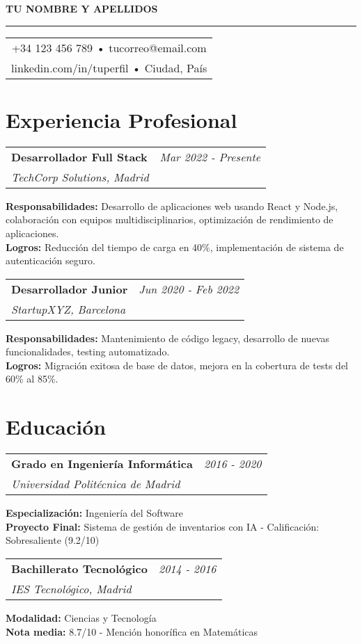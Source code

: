 \documentclass[11pt,a4paper]{article}
\makeatletter
\newcommand{\tableentry}[4]{
  \begin{tabularx}{\textwidth}{@{}X@{\hspace{1em}}r@{}}
    \textbf{#1} & \textit{#2} \\
    \textit{#3} & \\
  \end{tabularx}
  \vspace{0.2em}
  #4
  \vspace{0.8em}
}
\makeatother
\begin{document}
\begin{center}
  {\huge\bfseries TU NOMBRE Y APELLIDOS}
  
  \vspace{0.3em}
  {\color{accentcolor}\rule{0.6\textwidth}{3pt}}
  
  \vspace{0.8em}
  \begin{tabular}{c}
    +34 123 456 789 \quad • \quad tucorreo@email.com \\
    linkedin.com/in/tuperfil \quad • \quad Ciudad, País
  \end{tabular}
\end{center}

\vspace{1.2em}

\section{Experiencia Profesional}

\tableentry{Desarrollador Full Stack}{Mar 2022 - Presente}{TechCorp Solutions, Madrid}{
  \textbf{Responsabilidades:} Desarrollo de aplicaciones web usando React y Node.js, colaboración con equipos multidisciplinarios, optimización de rendimiento de aplicaciones. \\
  \textbf{Logros:} Reducción del tiempo de carga en 40\%, implementación de sistema de autenticación seguro.
}

\tableentry{Desarrollador Junior}{Jun 2020 - Feb 2022}{StartupXYZ, Barcelona}{
  \textbf{Responsabilidades:} Mantenimiento de código legacy, desarrollo de nuevas funcionalidades, testing automatizado. \\
  \textbf{Logros:} Migración exitosa de base de datos, mejora en la cobertura de tests del 60\% al 85\%.
}

\section{Educación}

\tableentry{Grado en Ingeniería Informática}{2016 - 2020}{Universidad Politécnica de Madrid}{
  \textbf{Especialización:} Ingeniería del Software \\
  \textbf{Proyecto Final:} Sistema de gestión de inventarios con IA - Calificación: Sobresaliente (9.2/10)
}

\tableentry{Bachillerato Tecnológico}{2014 - 2016}{IES Tecnológico, Madrid}{
  \textbf{Modalidad:} Ciencias y Tecnología \\
  \textbf{Nota media:} 8.7/10 - Mención honorífica en Matemáticas
}
\end{document}
